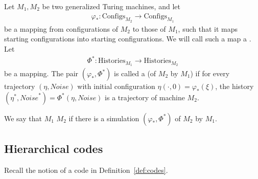 \documentclass[12pt]{memoir}
\newcommand{\Configs}{\mathrm{Configs}}
\newcommand{\Noise}{\mathit{Noise}}
\newcommand{\Histories}{\mathrm{Histories}}
\begin{document}
\begin{definition}[Simulation] \label{def:simulation-central}
Let \( M_{1},M_{2} \) be two generalized Turing machines, and let
\begin{align*}
    \varphi_{*}:\Configs_{M_{2}} \to \Configs_{M_{1}}
\end{align*}
be a mapping from configurations of \( M_{2} \)
to those of \( M_{1} \), such that it maps
starting configurations into starting configurations.
We will call such a map a .
Let
\begin{align*}
   \Phi^{*}:\Histories_{M_{1}} \to \Histories_{M_{2}}
\end{align*}
be a mapping.
The pair \( (\varphi_{*}, \Phi^{*})  \)
is called a  (of \(  M_{2}  \) by \(  M_{1}  \)) if for every
trajectory \(  (\eta, \Noise)  \) with initial
configuration \(  \eta(\cdot,0)=\varphi_{*}(\xi)  \),
the history \(  (\eta^{*},\Noise^{*})=\Phi^{*}(\eta,\Noise)  \) is
a trajectory of machine \(  M_{2}  \).

We say that \( M_{1} \)  \( M_{2} \) if there is a simulation
\( (\varphi_{*},\Phi^{*}) \) of \( M_{2} \) by \( M_{1} \).
\end{definition}

\subsection{Hierarchical codes}\label{sec:hier-codes}

Recall the notion of a code in Definition~\ref{def:codes}.
\end{document}
